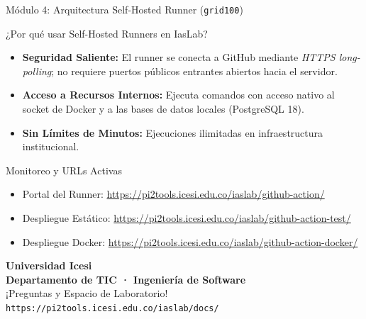 \documentclass[aspectratio=169,10pt]{beamer}
\begin{document}
\begin{frame}{Módulo 4: Arquitectura Self-Hosted Runner (\texttt{grid100})}
  \begin{block}{¿Por qué usar Self-Hosted Runners en IasLab?}
    \begin{itemize}
      \item \textbf{Seguridad Saliente:} El runner se conecta a GitHub mediante \textit{HTTPS long-polling}; no requiere puertos públicos entrantes abiertos hacia el servidor.
      \item \textbf{Acceso a Recursos Internos:} Ejecuta comandos con acceso nativo al socket de Docker y a las bases de datos locales (PostgreSQL 18).
      \item \textbf{Sin Límites de Minutos:} Ejecuciones ilimitadas en infraestructura institucional.
    \end{itemize}
  \end{block}

  \begin{alertblock}{Monitoreo y URLs Activas}
    \begin{itemize}
      \item Portal del Runner: \url{https://pi2tools.icesi.edu.co/iaslab/github-action/}
      \item Despliegue Estático: \url{https://pi2tools.icesi.edu.co/iaslab/github-action-test/}
      \item Despliegue Docker: \url{https://pi2tools.icesi.edu.co/iaslab/github-action-docker/}
    \end{itemize}
  \end{alertblock}
\end{frame}

\begin{frame}[plain]
  \begin{center}
    \vspace{1cm}
    {\Huge \textbf{\color{IcesiBlue} Universidad Icesi}}\\[0.4cm]
    {\Large \textbf{\color{IcesiOrange} Departamento de TIC · Ingeniería de Software}}\\[1cm]
    {\large ¡Preguntas y Espacio de Laboratorio!}\\[0.5cm]
    \texttt{https://pi2tools.icesi.edu.co/iaslab/docs/}
  \end{center}
\end{frame}
\end{document}
